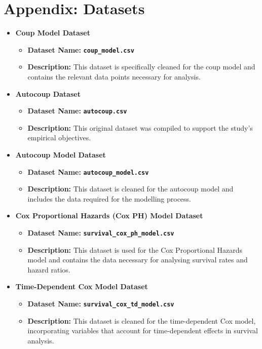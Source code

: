 \documentclass[
  12pt,
]{report}
\begin{document}
\chapter*{\texorpdfstring{Appendix\textbf{:
Datasets}}{Appendix: Datasets}}\label{appendix-datasets}

\begin{itemize}
\item
  \textbf{Coup Model Dataset}

  \begin{itemize}
  \item
    \textbf{Dataset Name:} \textbf{\texttt{coup\_model.csv}}
  \item
    \textbf{Description:} This dataset is specifically cleaned for the
    coup model and contains the relevant data points necessary for
    analysis.
  \end{itemize}
\item
  \textbf{Autocoup Dataset}

  \begin{itemize}
  \item
    \textbf{Dataset Name:} \textbf{\texttt{autocoup.csv}}
  \item
    \textbf{Description:} This original dataset was compiled to support
    the study's empirical objectives.
  \end{itemize}
\item
  \textbf{Autocoup Model Dataset}

  \begin{itemize}
  \item
    \textbf{Dataset Name:} \textbf{\texttt{autocoup\_model.csv}}
  \item
    \textbf{Description:} This dataset is cleaned for the autocoup model
    and includes the data required for the modelling process.
  \end{itemize}
\item
  \textbf{Cox Proportional Hazards (Cox PH) Model Dataset}

  \begin{itemize}
  \item
    \textbf{Dataset Name:}
    \textbf{\texttt{survival\_cox\_ph\_model.csv}}
  \item
    \textbf{Description:} This dataset is used for the Cox Proportional
    Hazards model and contains the data necessary for analysing survival
    rates and hazard ratios.
  \end{itemize}
\item
  \textbf{Time-Dependent Cox Model Dataset}

  \begin{itemize}
  \item
    \textbf{Dataset Name:}
    \textbf{\texttt{survival\_cox\_td\_model.csv}}
  \item
    \textbf{Description:} This dataset is cleaned for the time-dependent
    Cox model, incorporating variables that account for time-dependent
    effects in survival analysis.
  \end{itemize}
\end{itemize}
\end{document}
